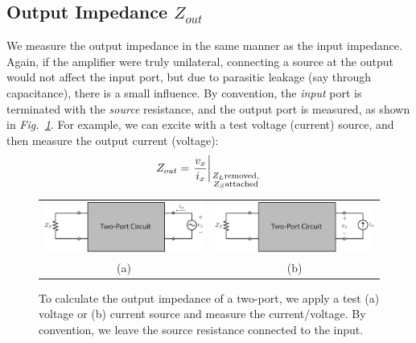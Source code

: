 \subsection{Output Impedance \texorpdfstring{$Z_{out}$}{}}
We measure the output impedance in the same manner as the input impedance.  Again, if the amplifier were truly unilateral, connecting a source at the output would not affect the input port, but due to parasitic leakage (say through capacitance), there is a small influence.  By convention, the \textit{input} port is terminated with the \textit{source} resistance, and the output port is measured, as shown in \emph{Fig.~\ref{fig:2port_zout_vx}}.
For example, we can excite with a test voltage (current) source, and then measure the output current (voltage):
    \begin{equation}
        {Z_{out}} = {\left. \frac{v_x}{i_x}\right|_{\genfrac{}{}{0pt}{2}
            {\scriptstyle{Z_L}\text{removed},}
            {\scriptstyle{Z_S}\text{attached}}}}
    \end{equation}
\begin{figure}[tb]
\centering
\begin{tabular}{cc}
\includegraphics[width=.45\columnwidth]{2port_zout_vx} &
\includegraphics[width=.45\columnwidth]{2port_zout_ix}\\
(a) & (b)\\
\end{tabular}
\caption{To calculate the output impedance of a two-port, we apply a test (a) voltage or (b) current source and measure the current/voltage.  By convention, we leave the source resistance connected to the input.}
\label{fig:2port_zout_vx}
\end{figure}
